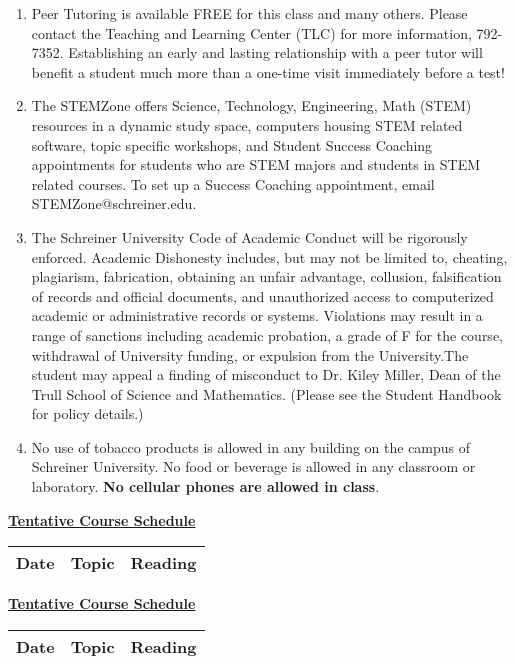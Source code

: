 \documentclass[11pt, a4paper]{article}
\begin{document}
\begin{enumerate}
\item Peer Tutoring is available FREE for this class and many others.  Please contact the Teaching and Learning Center (TLC) for more information, 792-7352.  Establishing an early and lasting relationship with a peer tutor will benefit a student much more than a one-time visit immediately before a test!

\item The STEMZone offers Science, Technology, Engineering, Math (STEM) resources in a dynamic study space, computers housing STEM related software, topic specific workshops, and Student Success Coaching appointments for students who are STEM majors and students in STEM related courses. To set up a Success Coaching appointment, email STEMZone@schreiner.edu.

\item The Schreiner University Code of Academic Conduct will be rigorously enforced. Academic Dishonesty includes, but may not be limited to, cheating, plagiarism, fabrication, obtaining an unfair advantage, collusion, falsification of records and official documents, and unauthorized access to computerized academic or administrative records or systems. Violations may result in a range of sanctions including academic probation, a grade of F for the course, withdrawal of University funding, or expulsion from the University.The student may appeal a finding of misconduct to Dr. Kiley Miller, Dean of the Trull School of Science and Mathematics. (Please see the Student Handbook for policy details.)

\item No use of tobacco products is allowed in any building on the campus of Schreiner University.  No food or beverage is allowed in any classroom or laboratory. \textbf{No cellular phones are allowed in class}.
\end{enumerate}


\newpage

\centerline{\Large \underline{\textbf{Tentative Course Schedule}}}
\vspace{5pt}
\small
\begin{tabular}{ |p{0.5in}|p{4.0in}|p{1.0in}| }
\hline
   \textbf{Date} & \textbf{Topic} & \textbf{Reading}  \\ \hline
\end{tabular}

\newpage

\centerline{\Large \underline{\textbf{Tentative Course Schedule}}}
\vspace{5pt}
\small
\begin{tabular}{ |p{0.5in}|p{4.0in}|p{1.0in}| }
\hline
  \textbf{Date} & \textbf{Topic} & \textbf{Reading}  \\ \hline

\end{tabular}

\end{document}
